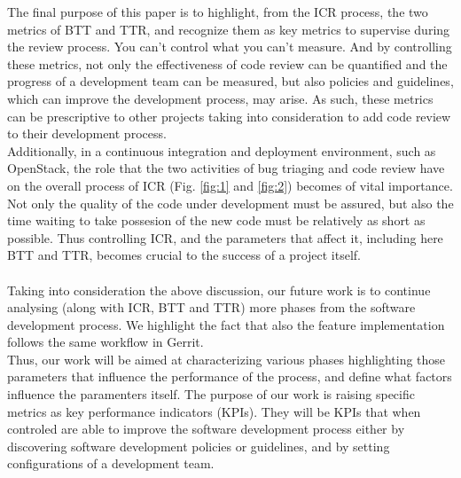 \documentclass[10pt, conference]{IEEEtran}
\begin{document}
The final purpose of this paper is to highlight, from the ICR process, the two metrics of BTT and TTR, 
and recognize them as key metrics to 
supervise during the review process. You can't control what you can't measure.
And by controlling these metrics, not only the effectiveness of code review can be quantified and the progress of 
a development team can be measured, but also policies and guidelines, which can improve the development process, 
may arise.
As such, these metrics can be prescriptive to other projects taking into consideration to add code review to 
their development process. 
\\Additionally, in a continuous integration and deployment environment, such as OpenStack, 
the role that the two activities of bug triaging and code review have on the overall process of ICR (Fig. \ref{fig:1} 
and \ref{fig:2}) becomes of vital importance. Not only the quality of the code under development must be assured, 
but also the time waiting to take possesion of the new code must be relatively as short as possible. 
Thus controlling ICR, and the parameters that affect it, including here BTT and TTR, becomes crucial to the success of 
a project itself.
\\
\\
Taking into consideration the above discussion, our future work is to continue analysing 
(along with ICR, BTT and TTR) more phases 
from the software development process. We highlight the fact that also the feature implementation follows the 
same workflow in Gerrit. 
\\Thus, our work will be aimed at characterizing various phases highlighting those parameters that 
influence the performance of the process, and define what factors influence the paramenters itself.
The purpose of our work is raising specific metrics as key performance indicators (KPIs). 
They will be KPIs that when controled are able to improve the software development process 
either by discovering software development policies or guidelines, and by setting configurations of 
a development team. 
 



\end{document}
